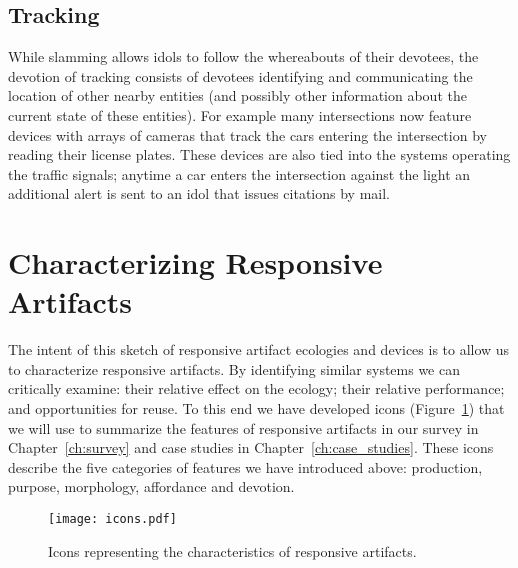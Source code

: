 \subsection{Tracking} 
%
While slamming allows idols to follow the whereabouts of their devotees, the devotion of tracking consists of devotees identifying and communicating the location of other nearby entities (and possibly other information about the current state of these entities). For example many intersections now feature devices with arrays of cameras that track the cars entering the intersection by reading their license plates. These devices are also tied into the systems operating the traffic signals; anytime a car enters the intersection against the light an additional alert is sent to an idol that issues citations by mail.

\section{Characterizing Responsive Artifacts}
\label{sec:characterizing}
%
The intent of this sketch of responsive artifact ecologies and devices is to allow us to characterize responsive artifacts. By identifying similar systems we can critically examine: their relative effect on the ecology; their relative performance; and opportunities for reuse. To this end we have developed icons (Figure~\ref{fig:icons}) that we will use to summarize the features of responsive artifacts in our survey in Chapter~\ref{ch:survey} and case studies in Chapter~\ref{ch:case_studies}. These icons describe the five categories of features we have introduced above: production, purpose, morphology, affordance and devotion.

\begin{figure}[tbh]
  \centering
    \texttt{[image: icons.pdf]}
  \caption{Icons representing the characteristics of responsive artifacts.}
  \label{fig:icons}
\end{figure}
